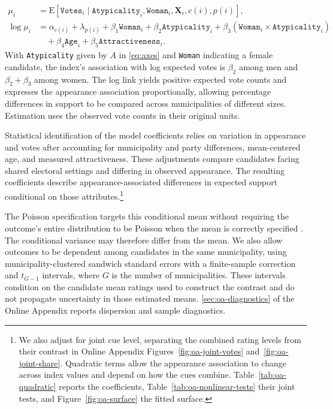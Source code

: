 \documentclass[11pt,a4paper]{article}\usepackage[]{graphicx}\usepackage[]{xcolor}
\begin{document}
\begin{equation}
\begin{aligned}
 \mu_i &= \mathrm{E}[\texttt{Votes}_i\mid
 \texttt{Atypicality}_i,\texttt{Woman}_i,\mathbf{X}_i,c(i),p(i)],
 \\[-0.1em]
 \log\mu_i &= \alpha_{c(i)}+\lambda_{p(i)}+\beta_1\texttt{Woman}_i
 +\beta_2\texttt{Atypicality}_i
 +\beta_3(\texttt{Woman}_i\times\texttt{Atypicality}_i)
 \\[-0.1em]
 &\quad+\beta_4\texttt{Age}_i+\beta_5\texttt{Attractiveness}_i.
\end{aligned}
\label{eq:model}
\end{equation}
With \texttt{Atypicality} given by $A$ in \autoref{eq:axes} and \texttt{Woman} indicating a female candidate, the index's association with log expected votes is $\beta_2$ among men and $\beta_2+\beta_3$ among women. The log link yields positive expected vote counts and expresses the appearance association proportionally, allowing percentage differences in support to be compared across municipalities of different sizes. Estimation uses the observed vote counts in their original units.

Statistical identification of the model coefficients relies on variation in appearance and votes after accounting for municipality and party differences, mean-centered age, and measured attractiveness. These adjustments compare candidates facing shared electoral settings and differing in observed appearance. The resulting coefficients describe appearance-associated differences in expected support conditional on those attributes.\footnote{We also adjust for joint cue level, separating the combined rating levels from their contrast in Online Appendix Figures~\ref{fig:oa-joint-votes} and~\ref{fig:oa-joint-share}. Quadratic terms allow the appearance association to change across index values and depend on how the cues combine. Table~\ref{tab:oa-quadratic} reports the coefficients, Table~\ref{tab:oa-nonlinear-tests} their joint tests, and Figure~\ref{fig:oa-surface} the fitted surface.}

The Poisson specification targets this conditional mean without requiring the outcome's entire distribution to be Poisson when the mean is correctly specified \parencite{SantosSilva2006}. The conditional variance may therefore differ from the mean. We also allow outcomes to be dependent among candidates in the same municipality, using municipality-clustered sandwich standard errors with a finite-sample correction and $t_{G-1}$ intervals, where $G$ is the number of municipalities. These intervals condition on the candidate mean ratings used to construct the contrast and do not propagate uncertainty in those estimated means. \autoref{sec:oa-diagnostics} of the Online Appendix reports dispersion and sample diagnostics.
\end{document}
